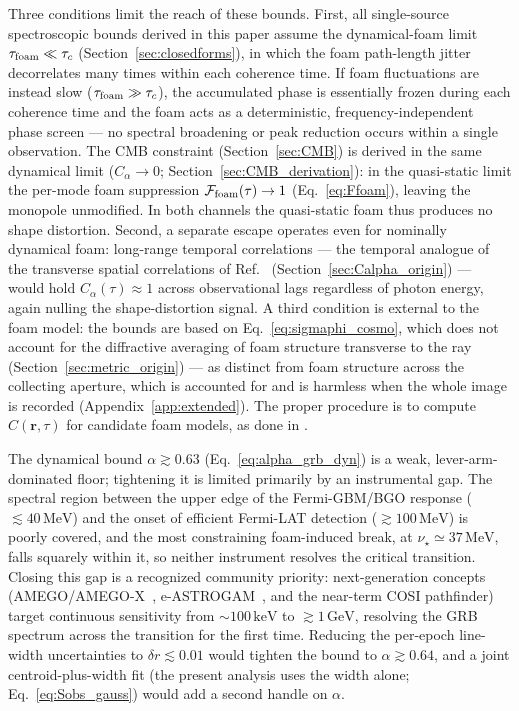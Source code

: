 \documentclass[aps,prd,onecolumn,amsmath,amssymb]{revtex4-2}
\begin{document}
Three conditions limit the reach of these bounds.  First, all
single-source spectroscopic bounds derived in this paper assume the
dynamical-foam limit $\tau_{\rm foam}\ll\tau_c$
(Section~\ref{sec:closedforms}), in which the foam path-length jitter
decorrelates many times within each coherence time.  If foam
fluctuations are instead slow ($\tau_{\rm foam}\gg\tau_c$), the
accumulated phase is essentially frozen during each coherence time and
the foam acts as a deterministic, frequency-independent phase screen
--- no spectral broadening or peak reduction occurs within a single
observation.  The CMB constraint (Section~\ref{sec:CMB}) is derived in
the same dynamical limit ($C_\alpha\to 0$;
Section~\ref{sec:CMB_derivation}): in the quasi-static limit the
per-mode foam suppression $\mathcal{F}_{\rm foam}(\tau)\to 1$
(Eq.~\eqref{eq:Ffoam}), leaving the monopole unmodified.  In both
channels the quasi-static foam thus produces no shape distortion.
Second, a separate escape operates even for nominally dynamical foam: long-range temporal
correlations --- the temporal analogue of the transverse spatial
correlations of Ref.~\cite{LeeZurekChen2024} (Section~\ref{sec:Calpha_origin})
--- would hold $C_\alpha(\tau)\approx1$ across observational lags
regardless of photon energy, again nulling the shape-distortion signal.
A third condition is external to the foam model: the bounds 
are based on Eq.~\eqref{eq:sigmaphi_cosmo}, which does not account for the
diffractive averaging of foam structure transverse to the ray
(Section~\ref{sec:metric_origin}) --- as distinct from foam structure across
the collecting aperture, which is accounted for and is harmless when the
whole image is recorded (Appendix~\ref{app:extended}).
The proper procedure is
to compute $C(\mathbf{r},\tau)$ for candidate foam models, as done in
\citet{LeeZurekChen2024}.

The dynamical bound $\alpha\gtrsim 0.63$ (Eq.~\eqref{eq:alpha_grb_dyn})
is a weak, lever-arm-dominated floor; tightening it is limited primarily
by an instrumental gap.  The spectral region between the upper edge of
the Fermi-GBM/BGO response ($\lesssim40\,\mathrm{MeV}$) and the onset of
efficient Fermi-LAT detection ($\gtrsim100\,\mathrm{MeV}$) is poorly
covered, and the most constraining foam-induced break, at
$\nu_\star\simeq37\,\mathrm{MeV}$, falls squarely within it, so neither
instrument resolves the critical transition.
Closing this gap is a recognized community priority: next-generation
concepts (AMEGO/AMEGO-X~\cite{McEnery2019,Caputo2022},
e-ASTROGAM~\cite{DeAngelis2017}, and the near-term COSI pathfinder) target
continuous sensitivity from $\sim100\,\mathrm{keV}$ to $\gtrsim1\,\mathrm{GeV}$,
resolving the GRB spectrum across the transition for the first time.
Reducing the per-epoch line-width
uncertainties to $\delta r\lesssim 0.01$ would tighten the bound to
$\alpha\gtrsim 0.64$, and a joint centroid-plus-width fit (the present
analysis uses the width alone; Eq.~\eqref{eq:Sobs_gauss}) would add a second
handle on $\alpha$.
\end{document}
